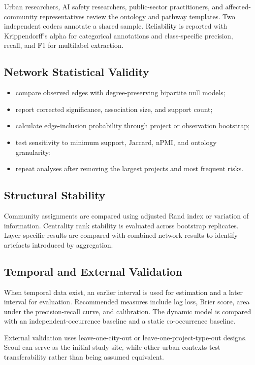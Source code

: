 \documentclass[11pt,a4paper]{article}
\begin{document}
Urban researchers, AI safety researchers, public-sector practitioners, and affected-community representatives review the ontology and pathway templates. Two independent coders annotate a shared sample. Reliability is reported with Krippendorff's alpha for categorical annotations and class-specific precision, recall, and F1 for multilabel extraction.

\subsection{Network Statistical Validity}

\begin{itemize}
  \item compare observed edges with degree-preserving bipartite null models;
  \item report corrected significance, association size, and support count;
  \item calculate edge-inclusion probability through project or observation bootstrap;
  \item test sensitivity to minimum support, Jaccard, nPMI, and ontology granularity;
  \item repeat analyses after removing the largest projects and most frequent risks.
\end{itemize}

\subsection{Structural Stability}

Community assignments are compared using adjusted Rand index or variation of information. Centrality rank stability is evaluated across bootstrap replicates. Layer-specific results are compared with combined-network results to identify artefacts introduced by aggregation.

\subsection{Temporal and External Validation}

When temporal data exist, an earlier interval is used for estimation and a later interval for evaluation. Recommended measures include log loss, Brier score, area under the precision-recall curve, and calibration. The dynamic model is compared with an independent-occurrence baseline and a static co-occurrence baseline.

External validation uses leave-one-city-out or leave-one-project-type-out designs. Seoul can serve as the initial study site, while other urban contexts test transferability rather than being assumed equivalent.
\end{document}
